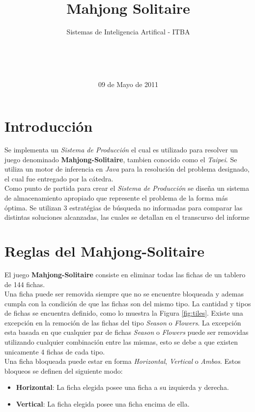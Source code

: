 \documentclass{sig-alternate}
\begin{document}

\title{Mahjong Solitaire}
\subtitle{Sistemas de Inteligencia Artifical - ITBA}


\author{
	\\
	\\
	\\
}

\date{09 de Mayo de 2011}

\maketitle

\section*{Introducci\'on}
	Se implementa un \textit{Sistema de Producci\'on} el cual es utilizado para resolver un juego denominado \textbf{Mahjong-Solitaire}, tambien conocido como el \textit{Taipei}. Se utiliza un motor de inferencia en \textit{Java} para la resoluci\'on del problema designado, el cual fue entregado por la c\'atedra. \\
	Como punto de partida para crear el \textit{Sistema de Producci\'on} se dise\~{n}a un sistema de almacenamiento apropiado que represente el problema de la forma m\'as \'optima. Se utilizan 3 estrat\'egias de b\'usqueda no informadas para comparar las distintas soluciones alcanzadas, las cuales se detallan en el transcurso del informe

\section*{Reglas del Mahjong-Solitaire}
	El juego \textbf{Mahjong-Solitaire} consiste en eliminar todas las fichas de un tablero de 144 fichas. \\
	Una ficha puede ser removida siempre que no se encuentre bloqueada y ademas cumpla con la condici\'on de que las fichas son del mismo tipo. La cantidad y tipos de fichas se encuentra definido, como lo muestra la Figura \ref{fig:tiles}. Existe una excepci\'on en la remoci\'on de las fichas del tipo \textit{Season} o \textit{Flowers}. La excepci\'on esta basada en que cualquier par de fichas \textit{Season} o \textit{Flowers} puede ser removidas utilizando cualquier combinaci\'on entre las mismas, esto se debe a que existen unicamente 4 fichas de cada tipo. \\
	Una ficha bloqueada puede estar en forma \textit{Horizontal}, \textit{Vertical} o \textit{Ambos}. Estos bloqueos se definen del siguiente modo:
	\begin{itemize}
		\item \textbf{Horizontal}: La ficha elegida posee una ficha a su izquierda y derecha.
		\item \textbf{Vertical}: La ficha elegida posee una ficha encima de ella.		
	\end{itemize}
	
\end{document}
